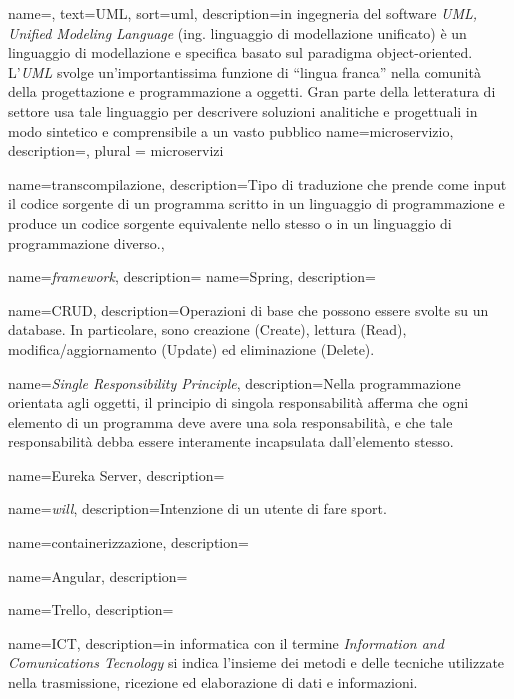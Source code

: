 {
    name=,
    text=UML,
    sort=uml,
    description={in ingegneria del software \emph{UML, Unified Modeling Language} (ing. linguaggio di modellazione unificato) è un linguaggio di modellazione e specifica basato sul paradigma object-oriented. L'\emph{UML} svolge un'importantissima funzione di ``lingua franca'' nella comunità della progettazione e programmazione a oggetti. Gran parte della letteratura di settore usa tale linguaggio per descrivere soluzioni analitiche e progettuali in modo sintetico e comprensibile a un vasto pubblico}
}
{
    name={microservizio},
    description={},
    plural = {microservizi}
}

{
    name={transcompilazione},
    description={Tipo di traduzione 
    che prende come input il codice sorgente di un programma scritto in un linguaggio di programmazione e produce un codice sorgente equivalente nello stesso o in un linguaggio di programmazione diverso.},
}


{
    name={\textit{framework}},
    description={}
}
{
    name={Spring},
    description={}
}

{
    name={CRUD},
    description={Operazioni di base che possono essere svolte su un database. In particolare,
    sono creazione (Create), lettura (Read), modifica/aggiornamento (Update) ed
    eliminazione (Delete).}
}


{
    name=\textit{Single Responsibility Principle},
    description={Nella programmazione orientata agli oggetti, il principio di singola responsabilità afferma che ogni elemento di un programma deve avere una sola responsabilità, e che tale responsabilità debba essere interamente incapsulata dall'elemento stesso.}
}

{
    name={Eureka Server},
    description={}
}


{
    name={\textit{will}},
    description={Intenzione di un utente di fare sport.}
}


{
    name={containerizzazione},
    description={}
}

{
    name={Angular},
    description={}
}

{
    name={Trello},
    description={}
}

{
    name={ICT},
    description={in informatica con il termine \textit{Information and Comunications Tecnology} 
    si indica l'insieme dei metodi e delle tecniche utilizzate nella trasmissione, ricezione 
    ed elaborazione di dati e informazioni.}
}


